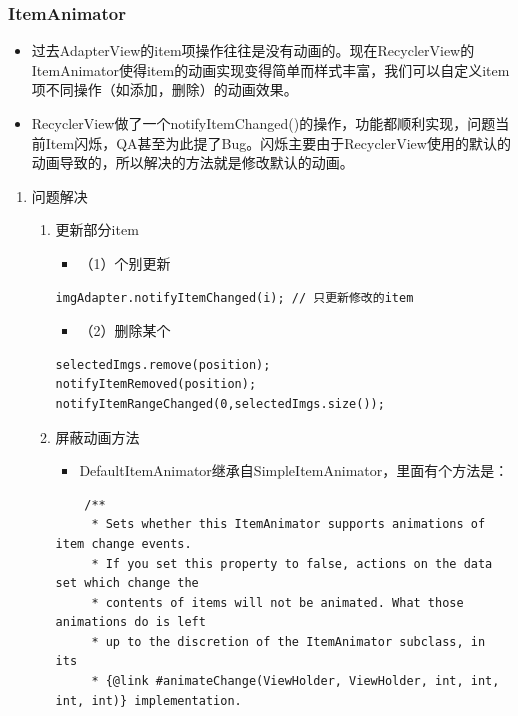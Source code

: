 \documentclass[9pt, b5paper]{article}
\begin{document}
\subsubsection{ItemAnimator}
\label{sec-5-3-5}
\begin{itemize}
\item 过去AdapterView的item项操作往往是没有动画的。现在RecyclerView的ItemAnimator使得item的动画实现变得简单而样式丰富，我们可以自定义item项不同操作（如添加，删除）的动画效果。
\item RecyclerView做了一个notifyItemChanged()的操作，功能都顺利实现，问题当前Item闪烁，QA甚至为此提了Bug。闪烁主要由于RecyclerView使用的默认的动画导致的，所以解决的方法就是修改默认的动画。
\end{itemize}
\begin{enumerate}
\item 问题解决
\label{sec-5-3-5-1}
\begin{enumerate}
\item 更新部分item
\label{sec-5-3-5-1-1}
\begin{itemize}
\item （1）个别更新
\end{itemize}
\begin{verbatim}
imgAdapter.notifyItemChanged(i); // 只更新修改的item
\end{verbatim}
\begin{itemize}
\item （2）删除某个
\end{itemize}
\begin{verbatim}
selectedImgs.remove(position);
notifyItemRemoved(position);
notifyItemRangeChanged(0,selectedImgs.size());
\end{verbatim}
\item 屏蔽动画方法
\label{sec-5-3-5-1-2}
\begin{itemize}
\item DefaultItemAnimator继承自SimpleItemAnimator，里面有个方法是：
\end{itemize}
\begin{verbatim}
    /**
     * Sets whether this ItemAnimator supports animations of item change events.
     * If you set this property to false, actions on the data set which change the
     * contents of items will not be animated. What those animations do is left
     * up to the discretion of the ItemAnimator subclass, in its
     * {@link #animateChange(ViewHolder, ViewHolder, int, int, int, int)} implementation.

\end{verbatim}
\end{enumerate}
\end{enumerate}
\end{document}
